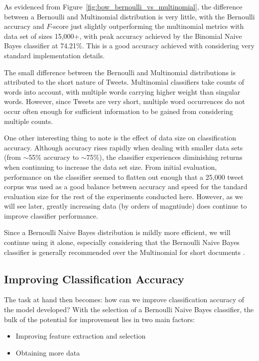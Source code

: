 \documentclass[letter,12pt]{article}
\begin{document}
As evidenced from Figure~\ref{fig:bow_bernoulli_vs_multinomial}, the difference
between a Bernoulli and Multinomial distribution is very little, with the
Bernoulli accuracy and $F$-score just slightly outperforming the multinomial
metrics with data set of sizes 15,000+, with peak accuracy achieved by the
Binomial Naive Bayes classifier at 74.21\%. This is a good accuracy achieved
with considering very standard implementation details.

The small difference between the Bernoulli and Multinomial distributions is
attributed to the short nature of Tweets. Multinomial classifiers take counts
of words into account, with multiple words carrying higher weight than singular
words. However, since Tweets are very short, multiple word occurrences do not
occur often enough for sufficient information to be gained from considering
multiple counts.

One other interesting thing to note is the effect of data size on
classification accuracy. Although accuracy rises rapidly when dealing with
smaller data sets (from $\sim$55\% accuracy to $\sim$75\%), the classifier
experiences diminishing returns when continuing to increase the data set size.
From initial evaluation, performance on the classifier seemed to flatten out
enough that a 25,000 tweet corpus was used as a good balance between accuracy
and speed for the tandard evaluation size for
the rest of the experiments conducted here. However, as we will see later,
greatly increasing data (by orders of magntiude) does continue to improve
classifier performance.

Since a Bernoulli Naive Bayes distribution is mildly more efficient, we will
continue using it alone, especially considering that the Bernoulli Naive Bayes
classifier is generally recommended over the Multinomial for short documents
\cite{manning08}.

\subsection{Improving Classification Accuracy}

The task at hand then becomes: how can we improve classification accuracy of
the model developed? With the selection of a Bernoulli Naive Bayes classifier,
the bulk of the potential for improvement lies in two main factors:

\begin{itemize}
  \item Improving feature extraction and selection
  \item Obtaining more data
\end{itemize}
\end{document}
